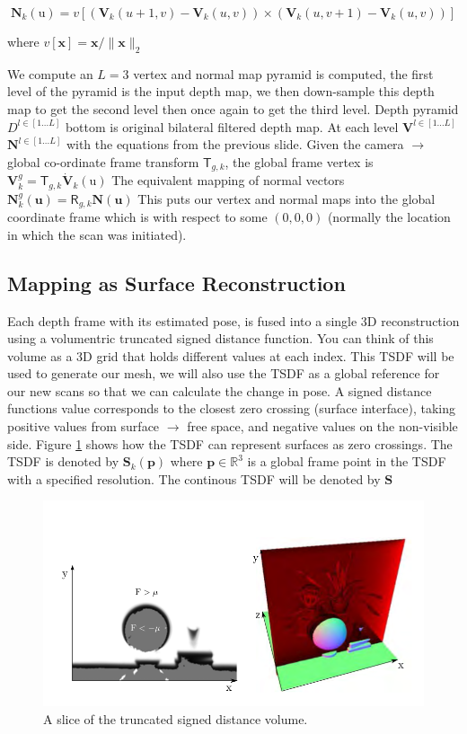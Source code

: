\documentclass[10pt, twocolumn]{article}
\begin{document}
\begin{equation}
\mathbf{N}_k(\mathrm{u}) = v[(\mathbf{V}_k(u+1,v) - \mathbf{V}_k(u, v)) \times (\mathbf{V}_k(u,v+1) - \mathbf{V}_k(u,v))]
\end{equation}

 where $v[\mathbf{x}] = \mathbf{x} / \| \mathbf{x} \|_{2}$

We compute an $L = 3$ vertex and normal map pyramid is computed, the first level of the pyramid is the input depth map, we then down-sample this depth map to get the second level then once again to get the third level. 
Depth pyramid $D^{l \in[1\dots L]}$ bottom is original bilateral filtered depth map. 
At each level $\textbf{V}^{l \in[1\dots L]}$ $\textbf{N}^{l \in[1\dots L]}$ with the equations from the previous slide.
Given the camera $\rightarrow$ global co-ordinate frame transform $\mathsf{T}_{g,k}$, the global frame vertex is $\textbf{V}^{g}_{k} = \mathsf{T}_{g,k} \dot{\textbf{V}}_{k}(\mathrm{u})$
The equivalent mapping of normal vectors $\mathbf{N}^{g}_{k}(\mathbf{u}) = \mathsf{R}_{g,k}\mathbf{N}(\mathbf{u})$
This puts our vertex and normal maps into the global coordinate frame which is with respect to some $(0, 0, 0)$ (normally the location in which the scan was initiated).

\subsection{Mapping as Surface Reconstruction}
Each depth frame with its estimated pose, is fused into a single 3D reconstruction using a volumentric truncated signed distance function. You can think of this volume as a 3D grid that holds different values at each index. 
This TSDF will be used to generate our mesh, we will also use the TSDF as a global reference for our new scans so that we can calculate the change in pose. 
A signed distance functions value corresponds to the closest zero crossing (surface interface), taking positive values from surface $\rightarrow$ free space, and negative values on the non-visible side. Figure \ref{fig:tsdfslice} shows how the TSDF can represent surfaces as zero crossings.
The TSDF is denoted by $\mathbf{S}_{k}(\mathbf{p})$ where $\mathbf{p} \in \mathbb{R}^{3}$ is a global frame point in the TSDF with a specified resolution. The continous TSDF will be denoted by $\mathbf{S}$

\begin{figure}
  \centering
  \includegraphics[width=0.8\linewidth]{tsdf}
  \caption{A slice of the truncated signed distance volume.}
  \label{fig:tsdfslice}
\end{figure}
\end{document}
